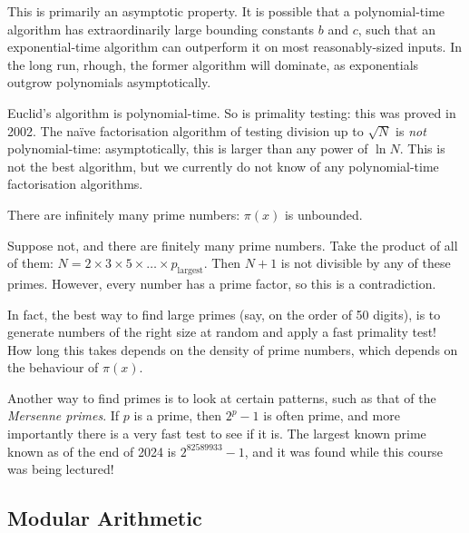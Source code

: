 \documentclass{article}
\begin{document}
\begin{note}
	This is primarily an asymptotic property. It is possible that a polynomial-time algorithm has extraordinarily large bounding constants $b$ and $c$, such that an exponential-time algorithm can outperform it on most reasonably-sized inputs. In the long run, rhough, the former algorithm will dominate, as exponentials outgrow polynomials asymptotically.
\end{note}

Euclid's algorithm is polynomial-time. So is primality testing: this was proved in 2002. The na\"ive factorisation algorithm of testing division up to $\sqrt{N}$ is \textit{not} polynomial-time: asymptotically, this is larger than any power of $\ln N$. This is not the best algorithm, but we currently do not know of any polynomial-time factorisation algorithms.

\begin{theorem}
	There are infinitely many prime numbers: $\pi(x)$ is unbounded.
\end{theorem}

\begin{prf}
Suppose not, and there are finitely many prime numbers. Take the product of all of them: $N = 2 \times 3 \times 5 \times \ldots \times p_\text{largest}$. Then $N + 1$ is not divisible by any of these primes. However, every number has a prime factor, so this is a contradiction.
\end{prf}

In fact, the best way to find large primes (say, on the order of 50 digits), is to generate numbers of the right size at random and apply a fast primality test! How long this takes depends on the density of prime numbers, which depends on the behaviour of $\pi(x)$.

Another way to find primes is to look at certain patterns, such as that of the \textit{Mersenne primes}. If $p$ is a prime, then $2^p - 1$ is often prime, and more importantly there is a very fast test to see if it is. The largest known prime known as of the end of 2024 is $2^{82589933} - 1$, and it was found while this course was being lectured!


\subsection{Modular Arithmetic}
\label{subsection-intro-modular-arithmetic}
\end{document}

